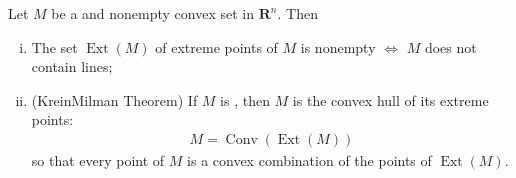 \documentclass{article}
\begin{document}
\begin{thma}\label{thm:kthma}
Let $M$ be a  and nonempty convex set in $\mathbf{R}^{n} .$ Then
\begin{enumerate}[i).]
    \item The set $\operatorname{Ext}(M)$ of extreme points of $M$ is nonempty $\Longleftrightarrow$ $M$ does not contain lines;
    \item (KreinMilman Theorem) If $M$ is , then $M$ is the convex hull of its extreme points:
\begin{align*}
M=\operatorname{Conv}(\operatorname{Ext}(M))
\end{align*}
so that every point of $M$ is a convex combination of the points of $\operatorname{Ext}(M)$.
\end{enumerate}
\end{thma} 
\end{document}
